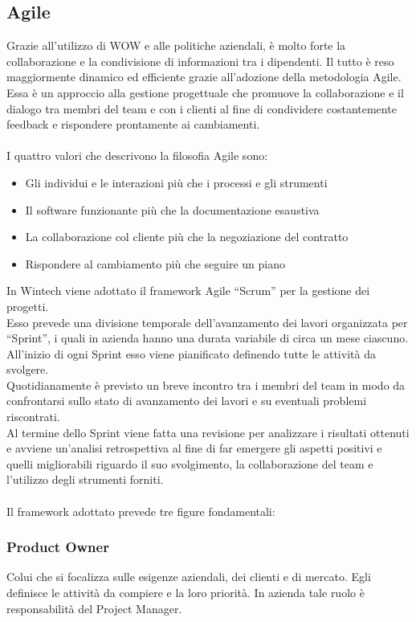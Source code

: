\subsection{Agile}
Grazie all'utilizzo di WOW e alle politiche aziendali, è molto forte la collaborazione e la condivisione di informazioni tra i dipendenti. Il tutto è reso maggiormente dinamico ed efficiente grazie all'adozione della metodologia Agile.\\
Essa è un approccio alla gestione progettuale che promuove la collaborazione e il dialogo tra membri del team e con i clienti al fine di condividere costantemente feedback e rispondere prontamente ai cambiamenti.\\\\
I quattro valori che descrivono la filosofia Agile sono:
\begin{itemize}
    \item Gli individui e le interazioni più che i processi e gli strumenti 
    \item Il software funzionante più che la documentazione esaustiva  
    \item La collaborazione col cliente più che la negoziazione del contratto 
    \item Rispondere al cambiamento più che seguire un piano\\
\end{itemize}
In Wintech viene adottato il framework Agile “Scrum” per la gestione dei progetti.\\
Esso prevede una divisione temporale dell'avanzamento dei lavori organizzata per “Sprint”, i quali in azienda hanno una durata variabile di circa un mese ciascuno.\\
All'inizio di ogni Sprint esso viene pianificato definendo tutte le attività da svolgere.\\ 
Quotidianamente è previsto un breve incontro tra i membri del team in modo da confrontarsi sullo stato di avanzamento dei lavori e su eventuali problemi riscontrati.\\
Al termine dello Sprint viene fatta una revisione per analizzare i risultati ottenuti e avviene un'analisi retrospettiva al fine di far emergere gli aspetti positivi e quelli migliorabili riguardo il suo svolgimento, la collaborazione del team e l'utilizzo degli strumenti forniti.\\\\
Il framework adottato prevede tre figure fondamentali: 
\subsubsection*{Product Owner}
Colui che si focalizza sulle esigenze aziendali, dei clienti e di mercato. Egli definisce le attività da compiere e la loro priorità.
In azienda tale ruolo è responsabilità del Project Manager. 

